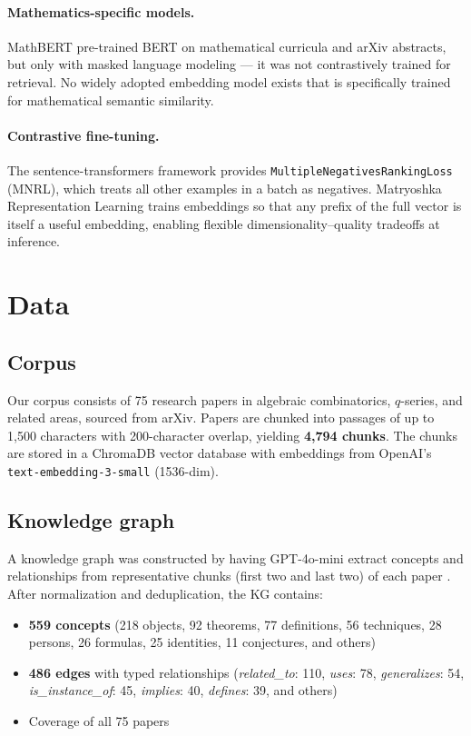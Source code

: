 \documentclass[11pt,a4paper]{article}
\begin{document}
\paragraph{Mathematics-specific models.}
MathBERT \cite{mathbert} pre-trained BERT on mathematical curricula and arXiv
abstracts, but only with masked language modeling --- it was not contrastively
trained for retrieval. No widely adopted embedding model exists that is
specifically trained for mathematical semantic similarity.

\paragraph{Contrastive fine-tuning.}
The sentence-transformers framework \cite{sbert} provides
\texttt{MultipleNegativesRankingLoss} (MNRL), which treats all other examples
in a batch as negatives. Matryoshka Representation Learning \cite{matryoshka}
trains embeddings so that any prefix of the full vector is itself a useful
embedding, enabling flexible dimensionality--quality tradeoffs at inference.


\section{Data}
\label{sec:data}

\subsection{Corpus}

Our corpus consists of 75 research papers in algebraic combinatorics,
$q$-series, and related areas, sourced from arXiv. Papers are chunked into
passages of up to 1,500 characters with 200-character overlap, yielding
\textbf{4,794 chunks}. The chunks are stored in a ChromaDB vector database
with embeddings from OpenAI's \texttt{text-embedding-3-small} (1536-dim).

\subsection{Knowledge graph}

A knowledge graph was constructed by having GPT-4o-mini extract concepts and
relationships from representative chunks (first two and last two) of each
paper \cite{kg-extraction}. After normalization and deduplication, the KG
contains:
\begin{itemize}[nosep]
    \item \textbf{559 concepts} (218 objects, 92 theorems, 77 definitions,
          56 techniques, 28 persons, 26 formulas, 25 identities, 11
          conjectures, and others)
    \item \textbf{486 edges} with typed relationships (\emph{related\_to}:
          110, \emph{uses}: 78, \emph{generalizes}: 54,
          \emph{is\_instance\_of}: 45, \emph{implies}: 40, \emph{defines}: 39,
          and others)
    \item Coverage of all 75 papers
\end{itemize}
\end{document}
